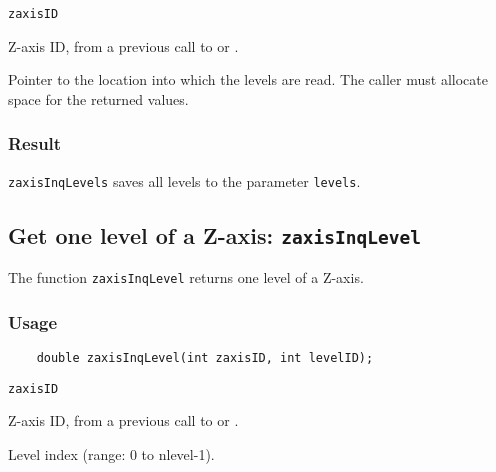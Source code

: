 \hspace*{4mm}\begin{minipage}[]{15cm}
\begin{deflist}{\tt zaxisID\ }
\item[{\tt zaxisID}]
Z-axis ID, from a previous call to {} or {}.
\item[{\tt levels}]
Pointer to the location into which the levels are read.
                    The caller must allocate space for the returned values.

\end{deflist}
\end{minipage}

\subsubsection*{Result}

{\tt zaxisInqLevels} saves all levels to the parameter {\tt levels}.


\subsection{Get one level of a Z-axis: {\tt zaxisInqLevel}}
\label{zaxisInqLevel}

The function {\tt zaxisInqLevel} returns one level of a Z-axis.

\subsubsection*{Usage}

\begin{verbatim}
    double zaxisInqLevel(int zaxisID, int levelID);
\end{verbatim}

\hspace*{4mm}\begin{minipage}[]{15cm}
\begin{deflist}{\tt zaxisID\ }
\item[{\tt zaxisID}]
Z-axis ID, from a previous call to {} or {}.
\item[{\tt levelID}]
Level index (range: 0 to nlevel-1).

\end{deflist}
\end{minipage}


